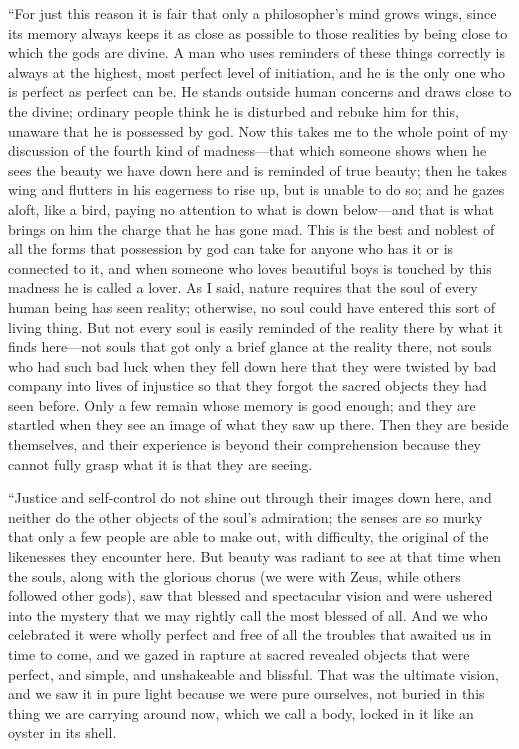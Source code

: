 “For just this reason it is fair that only a philosopher's mind grows
wings, since its memory always keeps it as close as possible to those
realities by being close to which the gods are divine. A man who uses
reminders of these things correctly is always at the highest, most
perfect level of initiation, and he is the only one who is perfect as
perfect can be. He stands outside human concerns and draws close to the
divine; ordinary people think he is disturbed and rebuke him for
this, unaware that he is possessed by god. Now this takes me to the
whole point of my discussion of the fourth kind of madness---that which
someone shows when he sees the beauty we have down here and is reminded
of true beauty; then he takes wing and flutters in his eagerness to rise
up, but is unable to do so; and he gazes aloft, like a bird, paying no
attention to what is down below---and that is what brings on him the
charge that he has gone mad. This is the best and noblest of all
the forms that possession by god can take for anyone who has it or is
connected to it, and when someone who loves beautiful boys is touched by
this madness he is called a lover. As I said, nature requires that the
soul of every human being has seen reality; otherwise, no soul could
have entered this sort of living thing. But not every 
soul is easily reminded of the reality there by what it finds here---not
souls that got only a brief glance at the reality there, not souls who
had such bad luck when they fell down here that they were twisted by bad
company into lives of injustice so that they forgot the sacred objects
they had seen before. Only a few remain whose memory is good enough; and
they are startled when they see an image of what they saw up there. Then
they are beside themselves, and their experience is beyond their
comprehension because they cannot fully grasp what it is that they are
seeing.

“Justice and self-control do not shine out through their images down
here, and neither do the other objects of the soul's admiration; the
senses are so murky that only a few people are able to make out, with
difficulty, the original of the likenesses they encounter here. But
beauty was radiant to see at that time when the souls, along with the
glorious chorus (we
were with Zeus, while others followed other gods), saw that blessed and
spectacular vision and were ushered into the mystery that we may rightly 
call the most blessed of all. And we who celebrated it were
wholly perfect and free of all the troubles that awaited us in time to
come, and we gazed in rapture at sacred revealed objects that were
perfect, and simple, and unshakeable and blissful. That was the ultimate
vision, and we saw it in pure light because we were pure ourselves, not
buried in this thing we are carrying around now, which we call a body,
locked in it like an oyster in its shell.

